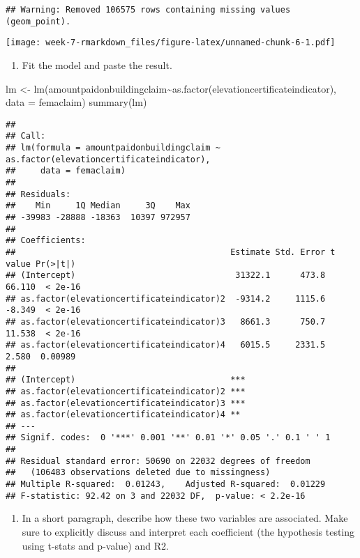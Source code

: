\documentclass[
]{article}
\newenvironment{Shaded}{\begin{snugshade}}{\end{snugshade}}
\newcommand{\AttributeTok}[1]{\textcolor[rgb]{0.77,0.63,0.00}{#1}}
\newcommand{\FunctionTok}[1]{\textcolor[rgb]{0.00,0.00,0.00}{#1}}
\newcommand{\NormalTok}[1]{#1}
\newcommand{\OtherTok}[1]{\textcolor[rgb]{0.56,0.35,0.01}{#1}}
\newcommand{\SpecialCharTok}[1]{\textcolor[rgb]{0.00,0.00,0.00}{#1}}
\providecommand{\tightlist}{%
  \setlength{\itemsep}{0pt}\setlength{\parskip}{0pt}}
\begin{document}
\begin{verbatim}
## Warning: Removed 106575 rows containing missing values (geom_point).
\end{verbatim}

\texttt{[image: week-7-rmarkdown\_files/figure-latex/unnamed-chunk-6-1.pdf]}

\begin{enumerate}
\def\labelenumi{\arabic{enumi}.}
\setcounter{enumi}{4}
\tightlist
\item
  Fit the model and paste the result.
\end{enumerate}

\begin{Shaded}
\begin{Highlighting}[]
\NormalTok{lm }\OtherTok{\textless{}{-}} \FunctionTok{lm}\NormalTok{(amountpaidonbuildingclaim}\SpecialCharTok{\textasciitilde{}}\FunctionTok{as.factor}\NormalTok{(elevationcertificateindicator), }\AttributeTok{data =}\NormalTok{ femaclaim)}
\FunctionTok{summary}\NormalTok{(lm)}
\end{Highlighting}
\end{Shaded}

\begin{verbatim}
## 
## Call:
## lm(formula = amountpaidonbuildingclaim ~ as.factor(elevationcertificateindicator), 
##     data = femaclaim)
## 
## Residuals:
##    Min     1Q Median     3Q    Max 
## -39983 -28888 -18363  10397 972957 
## 
## Coefficients:
##                                           Estimate Std. Error t value Pr(>|t|)
## (Intercept)                                31322.1      473.8  66.110  < 2e-16
## as.factor(elevationcertificateindicator)2  -9314.2     1115.6  -8.349  < 2e-16
## as.factor(elevationcertificateindicator)3   8661.3      750.7  11.538  < 2e-16
## as.factor(elevationcertificateindicator)4   6015.5     2331.5   2.580  0.00989
##                                              
## (Intercept)                               ***
## as.factor(elevationcertificateindicator)2 ***
## as.factor(elevationcertificateindicator)3 ***
## as.factor(elevationcertificateindicator)4 ** 
## ---
## Signif. codes:  0 '***' 0.001 '**' 0.01 '*' 0.05 '.' 0.1 ' ' 1
## 
## Residual standard error: 50690 on 22032 degrees of freedom
##   (106483 observations deleted due to missingness)
## Multiple R-squared:  0.01243,    Adjusted R-squared:  0.01229 
## F-statistic: 92.42 on 3 and 22032 DF,  p-value: < 2.2e-16
\end{verbatim}

\begin{enumerate}
\def\labelenumi{\arabic{enumi}.}
\setcounter{enumi}{5}
\tightlist
\item
  In a short paragraph, describe how these two variables are associated.
  Make sure to explicitly discuss and interpret each coefficient (the
  hypothesis testing using t-stats and p-value) and R2.
\end{enumerate}
\end{document}
